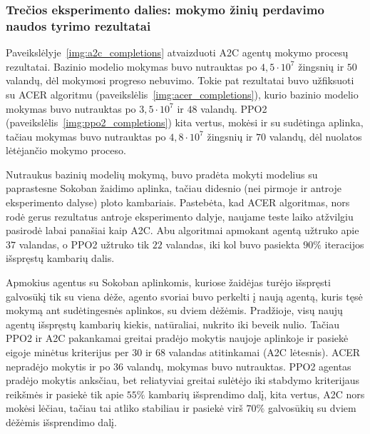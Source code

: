 \documentclass{VUMIFPSbakalaurinis}
\begin{document}
\subsubsection{Trečios eksperimento dalies: mokymo žinių perdavimo naudos tyrimo rezultatai}
{
	Paveikslėlyje~\ref{img:a2c_completions} atvaizduoti A2C agentų mokymo procesų rezultatai. Bazinio modelio mokymas buvo nutrauktas po \(4,5 \cdot 10^7\) žingsnių ir \(50\) valandų, dėl mokymosi progreso nebuvimo. Tokie pat rezultatai buvo užfiksuoti su ACER algoritmu (paveikslėlis~\ref{img:acer_completions}), kurio bazinio modelio mokymas buvo nutrauktas po \(3,5 \cdot 10^7\) ir \(48\) valandų. PPO2 (paveikslėlis~\ref{img:ppo2_completions}) kita vertus, mokėsi ir su sudėtinga aplinka, tačiau mokymas buvo nutrauktas po \(4,8 \cdot 10^7\) žingsnių ir \(70\) valandų, dėl nuolatos lėtėjančio mokymo proceso.\par
	
	Nutraukus bazinių modelių mokymą, buvo pradėta mokyti modelius su paprastesne Sokoban žaidimo aplinka, tačiau didesnio (nei pirmoje ir antroje eksperimento dalyse) ploto kambariais. Pastebėta, kad ACER algoritmas, nors rodė gerus rezultatus antroje eksperimento dalyje, naujame teste laiko atžvilgiu pasirodė labai panašiai kaip A2C. Abu algoritmai apmokant agentą užtruko apie \(37\) valandas, o PPO2 užtruko tik \(22\) valandas, iki kol buvo pasiekta \(90\%\) iteracijos išspręstų kambarių dalis.\par
	
	Apmokius agentus su Sokoban aplinkomis, kuriose žaidėjas turėjo išspręsti galvosūkį tik su viena dėže, agento svoriai buvo perkelti į naują agentą, kuris tęsė mokymą ant sudėtingesnės aplinkos, su dviem dėžėmis. Pradžioje, visų naujų agentų išspręstų kambarių kiekis, natūraliai, nukrito iki beveik nulio. Tačiau PPO2 ir A2C pakankamai greitai pradėjo mokytis naujoje aplinkoje ir pasiekė eigoje minėtus kriterijus per \(30\) ir \(68\) valandas atitinkamai (A2C lėtesnis). ACER nepradėjo mokytis ir po \(36\) valandų, mokymas buvo nutrauktas. PPO2 agentas pradėjo mokytis anksčiau, bet reliatyviai greitai sulėtėjo iki stabdymo kriterijaus reikšmės ir pasiekė tik apie \(55\%\) kambarių išsprendimo dalį, kita vertus, A2C nors mokėsi lėčiau, tačiau tai atliko stabiliau ir pasiekė virš \(70\%\) galvosūkių su dviem dėžėmis išsprendimo dalį.
	
}
\end{document}
